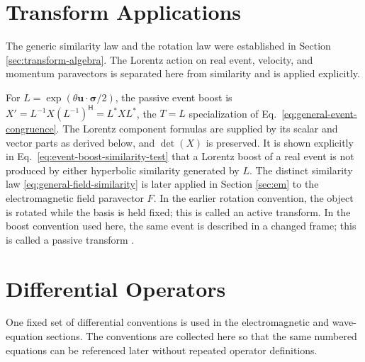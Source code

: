\documentclass[10pt,letterpaper]{article}
\newcommand{\eqfunc}[1]{\operatorname{#1}}
\newcommand{\pv}[1]{#1}
\newcommand{\vct}[1]{\mathbf{#1}}
\newcommand{\sigv}{\vct{\pv{\bm{\sigma}}}}
\newcommand{\Hop}{\mathsf H}
\newcommand{\conj}[1]{#1^{*}}
\newcommand{\detf}[1]{\eqfunc{det}\!\left(#1\right)}
\begin{document}
\section{Transform Applications}\label{sec:transforms}
The generic similarity law and the rotation law were established in Section
\ref{sec:transform-algebra}. The Lorentz action on real event, velocity, and
momentum paravectors is separated here from similarity and is applied
explicitly.

For \(\pv{L}=\exp(\theta\vct{u}\cdot\sigv/2)\), the passive event boost is
\(\pv{X}'=\pv{L}^{-1}\pv{X}(\pv{L}^{-1})^{\Hop}
=\conj{\pv{L}}\pv{X}\conj{\pv{L}}\), the
\(\pv{T}=\pv{L}\) specialization of
Eq.\ \eqref{eq:general-event-congruence}. The Lorentz component formulas are
supplied by its scalar and vector parts as derived below, and
\(\detf{\pv{X}}\) is preserved.
It is shown explicitly in Eq.\ \eqref{eq:event-boost-similarity-test} that a
Lorentz boost of a real event is not produced by either hyperbolic similarity
generated by \(\pv{L}\). The distinct
similarity law \eqref{eq:general-field-similarity} is later applied in
Section \ref{sec:em} to the electromagnetic field paravector \(\pv{F}\).
In the earlier rotation convention, the object is rotated while the basis is
held fixed; this is called an active transform. In the boost convention used
here, the same event is described in a changed frame; this is called a
passive transform \cite{einstein1905,baylis1999}.


\section{Differential Operators}\label{sec:differential}
One fixed set of differential conventions is used in the electromagnetic and wave-equation sections. The conventions are collected here so that the same numbered equations can be referenced later without repeated operator definitions.
\end{document}
